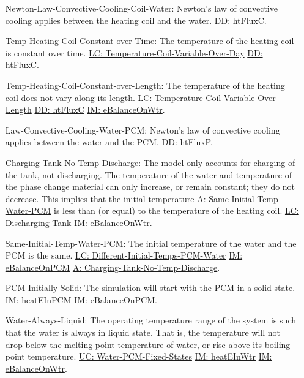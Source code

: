 \documentclass[12pt]{article}
\begin{document}
\begin{itemize}
\item[Newton-Law-Convective-Cooling-Coil-Water:\phantomsection\label{assumpLCCCW}]Newton's law of convective cooling applies between the heating coil and the water. \hyperref[DD:htFluxC]{DD: htFluxC}.
\item[Temp-Heating-Coil-Constant-over-Time:\phantomsection\label{assumpTHCCoT}]The temperature of the heating coil is constant over time. \hyperref[likeChgTCVOD]{LC: Temperature-Coil-Variable-Over-Day} \hyperref[DD:htFluxC]{DD: htFluxC}.
\item[Temp-Heating-Coil-Constant-over-Length:\phantomsection\label{assumpTHCCoL}]The temperature of the heating coil does not vary along its length. \hyperref[likeChgTCVOL]{LC: Temperature-Coil-Variable-Over-Length} \hyperref[DD:htFluxC]{DD: htFluxC} \hyperref[IM:eBalanceOnWtr]{IM: eBalanceOnWtr}.
\item[Law-Convective-Cooling-Water-PCM:\phantomsection\label{assumpLCCWP}]Newton's law of convective cooling applies between the water and the PCM. \hyperref[DD:htFluxP]{DD: htFluxP}.
\item[Charging-Tank-No-Temp-Discharge:\phantomsection\label{assumpCTNOD}]The model only accounts for charging of the tank, not discharging. The temperature of the water and temperature of the phase change material can only increase, or remain constant; they do not decrease. This implies that the initial temperature \hyperref[assumpSITWP]{A: Same-Initial-Temp-Water-PCM} is less than (or equal) to the temperature of the heating coil. \hyperref[likeChgDT]{LC: Discharging-Tank} \hyperref[IM:eBalanceOnWtr]{IM: eBalanceOnWtr}.
\item[Same-Initial-Temp-Water-PCM:\phantomsection\label{assumpSITWP}]The initial temperature of the water and the PCM is the same. \hyperref[likeChgDITPW]{LC: Different-Initial-Temps-PCM-Water} \hyperref[IM:eBalanceOnPCM]{IM: eBalanceOnPCM} \hyperref[assumpCTNOD]{A: Charging-Tank-No-Temp-Discharge}.
\item[PCM-Initially-Solid:\phantomsection\label{assumpPIS}]The simulation will start with the PCM in a solid state. \hyperref[IM:heatEInPCM]{IM: heatEInPCM} \hyperref[IM:eBalanceOnPCM]{IM: eBalanceOnPCM}.
\item[Water-Always-Liquid:\phantomsection\label{assumpWAL}]The operating temperature range of the system is such that the water is always in liquid state. That is, the temperature will not drop below the melting point temperature of water, or rise above its boiling point temperature. \hyperref[unlikeChgWPFS]{UC: Water-PCM-Fixed-States} \hyperref[IM:heatEInWtr]{IM: heatEInWtr} \hyperref[IM:eBalanceOnWtr]{IM: eBalanceOnWtr}.

\end{itemize}
\end{document}
